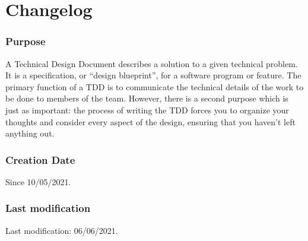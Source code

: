 \section*{Changelog}

\subsubsection*{Purpose}
A Technical Design Document describes a solution to a given technical problem. It is a specification, or “design blueprint”, for a software program or feature. The primary function of a TDD is to communicate the technical details of the work to be done to members of the team. However, there is a second purpose which is just as important: the process of writing the TDD forces you to organize your thoughts and consider every aspect of the design, ensuring that you haven’t left anything out.

\subsubsection*{Creation Date}
Since 10/05/2021.

\subsubsection*{Last modification}
Last modification: 06/06/2021.\\

